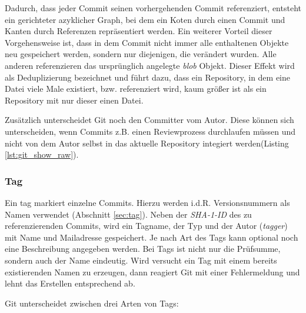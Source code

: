 Dadurch, dass jeder Commit seinen vorhergehenden Commit referenziert, entsteht ein
gerichteter azyklicher Graph, bei dem ein Koten durch einen Commit und Kanten
durch Referenzen repräsentiert werden. Ein weiterer Vorteil dieser
Vorgehensweise ist, dass in dem Commit nicht immer alle enthaltenen Objekte neu
gespeichert werden, sondern nur diejenigen, die verändert wurden. Alle anderen
referenzieren das ursprünglich angelegte \textit{blob} Objekt. Dieser Effekt
wird als Deduplizierung bezeichnet und führt dazu, dass ein Repository, in dem
eine Datei viele Male existiert, bzw. referenziert wird, kaum größer ist als ein
Repository mit nur dieser einen Datei.\cite[56-57]{gitosp}



Zusätzlich unterscheidet Git noch den Committer vom Autor. Diese können sich
unterscheiden, wenn Commits z.B. einen Reviewprozess durchlaufen müssen und
nicht von dem Autor selbst in das aktuelle Repository integiert werden(Listing
\ref{lst:git_show_raw}).

\subsubsection{Tag}\label{sec:tagobject}
Ein \gls{tag} markiert einzelne Commits. Hierzu werden i.d.R. Versionsnummern
als Namen verwendet (Abschnitt \ref{sec:tag}). Neben
der \textit{SHA-1-ID} des zu referenzierenden Commits, wird ein Tagname, der
Typ und der Autor (\textit{tagger}) mit Name und Mailadresse gespeichert. Je
nach Art des Tags kann optional noch eine Beschreibung angegeben werden. Bei
Tags ist nicht nur die Prüfsumme, sondern auch der Name eindeutig. Wird
versucht ein Tag mit einem bereits existierenden Namen zu erzeugen, dann
reagiert Git mit einer Fehlermeldung und lehnt das Erstellen entsprechend ab.

Git unterscheidet zwischen drei Arten von Tags:

